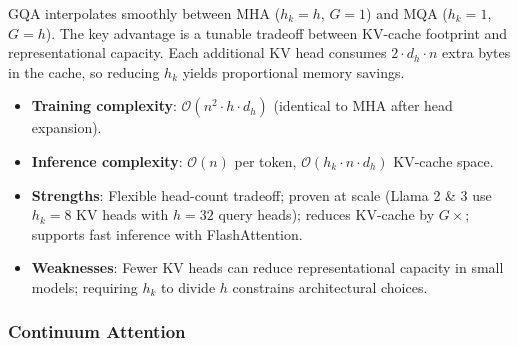 GQA interpolates smoothly between MHA ($h_k = h$, $G = 1$) and MQA ($h_k = 1$, $G = h$). The key advantage is a tunable tradeoff between KV-cache footprint and representational capacity. Each additional KV head consumes $2 \cdot d_h \cdot n$ extra bytes in the cache, so reducing $h_k$ yields proportional memory savings.

\begin{itemize}[leftmargin=*]
    \item \textbf{Training complexity}: $\mathcal{O}(n^2 \cdot h \cdot d_h)$ (identical to MHA after head expansion).
    \item \textbf{Inference complexity}: $\mathcal{O}(n)$ per token, $\mathcal{O}(h_k \cdot n \cdot d_h)$ KV-cache space.
    \item \textbf{Strengths}: Flexible head-count tradeoff; proven at scale (Llama 2 \& 3 use $h_k = 8$ KV heads with $h = 32$ query heads); reduces KV-cache by $G \times$; supports fast inference with FlashAttention.
    \item \textbf{Weaknesses}: Fewer KV heads can reduce representational capacity in small models; requiring $h_k$ to divide $h$ constrains architectural choices.
\end{itemize}

\subsubsection{Continuum Attention}

